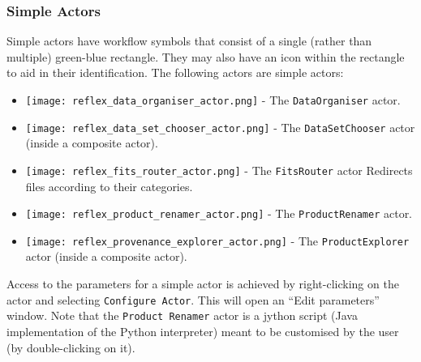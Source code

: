 \subsubsection{Simple Actors \label{sec:simple_actors}}

Simple actors have workflow symbols that consist of a single (rather
than multiple) green-blue rectangle. They may also have an icon within the rectangle
to aid in their identification. The following actors are simple actors:
\begin{itemize}
\item{\texttt{[image: reflex\_data\_organiser\_actor.png]} - The {\tt DataOrganiser} actor.}
\item{\texttt{[image: reflex\_data\_set\_chooser\_actor.png]} - The {\tt DataSetChooser} actor (inside a composite actor).}
\item{\texttt{[image: reflex\_fits\_router\_actor.png]} - The {\tt FitsRouter} actor} Redirects files according to their categories.
\item{\texttt{[image: reflex\_product\_renamer\_actor.png]} - The {\tt ProductRenamer} actor.}
\item{\texttt{[image: reflex\_provenance\_explorer\_actor.png]} - The {\tt ProductExplorer} actor (inside a composite actor).}
\end{itemize}

Access to the parameters for a simple actor is achieved by
right-clicking on the actor and selecting {\tt Configure Actor}. This
will open an ``Edit parameters'' window. Note that the {\tt Product Renamer}
actor is a jython script (Java implementation of the Python
interpreter) meant to be customised by the user (by double-clicking on
it).

